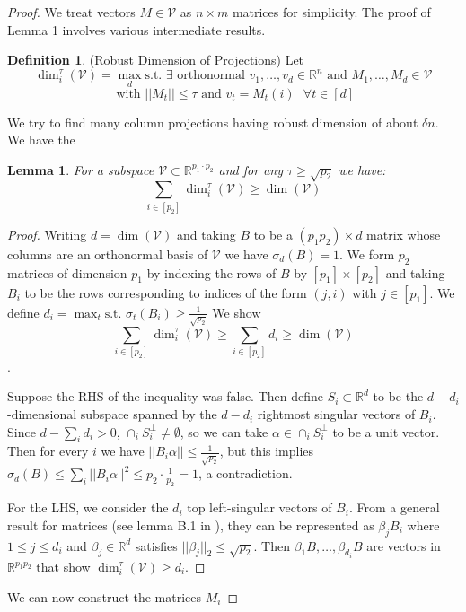 \documentclass[11pt]{article}
\newtheorem{lemma}{Lemma}
\theoremstyle{definition}
\newtheorem{definition}{Definition}
\begin{document}
\begin{proof}
We treat vectors $M\in \mathcal{V}$ as $n\times m$ matrices for simplicity. The proof of Lemma 1 involves various intermediate results.


\begin{definition} (Robust Dimension of Projections) Let
$$\dim_i^\tau (\mathcal{V}) = \max_{d}\text{s.t. }\exists\text{ orthonormal }v_1,\dots,v_d\in \mathbb{R}^n \text{ and }M_1,\dots,M_d\in\mathcal{V} $$
$$\text{ with } ||M_t||\leq \tau \text{ and } v_t=M_t(i)\text{ }\forall t\in[d]$$
\end{definition}
\noindent We try to find many column projections having robust dimension of about $\delta n$. We have the

\begin{lemma}
For a subspace $\mathcal{V}\subset \mathbb{R}^{p_1\cdot p_2}$ and for any $\tau\geq \sqrt{p_2}$ we have:
$$\sum_{i\in[p_2]}\dim_i^\tau (\mathcal{V})\geq \dim(\mathcal{V})$$
\end{lemma}

\begin{proof}
Writing $d=\dim(\mathcal{V})$ and taking $B$ to be a $(p_1p_2)\times d$ matrix whose columns are an orthonormal basis of $\mathcal{V}$ we have $\sigma_d(B)=1$. We form $p_2$ matrices of dimension $p_1$ by indexing the rows of $B$ by $[p_1]\times[p_2]$ and taking $B_i$ to be the rows corresponding to indices of the form $(j,i)$ with $j\in[p_1]$. We define
$d_i=\max_t \text{s.t. } \sigma_t(B_i)\geq \frac{1}{\sqrt{p_2}}$
We show $$\sum_{i\in[p_2]}\dim_i^\tau (\mathcal{V})\geq \sum_{i\in[p_2]} d_i\geq \dim(\mathcal{V})$$.

Suppose the RHS of the inequality was false. Then define $S_i\subset \mathbb{R}^d$ to be the $d-d_i$-dimensional subspace spanned by the $d-d_i$ rightmost singular vectors of $B_i$. Since $d-\sum_i d_i>0$, $\cap_i S_i^\perp\neq \emptyset$, so we can take $\alpha\in \cap_i S_i^\perp$ to be a unit vector. Then for every $i$ we have $||B_i\alpha||\leq \frac{1}{\sqrt{p_2}}$, but this implies $\sigma_d(B)\leq \sum_i||B_i\alpha||^2\leq p_2\cdot\frac{1}{p_2}=1$, a contradiction.

For the LHS, we consider the $d_i$ top left-singular vectors of $B_i$. From a general result for matrices (see lemma B.1 in \cite{TD}), they can be represented as $\beta_j B_i$ where $1\leq j\leq d_i$ and $\beta_j\in \mathbb{R}^{d}$ satisfies $||\beta_j||_2\leq \sqrt{p_2}$. Then $\beta_1B,\dots,\beta_{d_i}B$ are vectors in $\mathbb{R}^{p_1p_2}$ that show $\dim_i^\tau(\mathcal{V})\geq d_i$.

\end{proof}

We can now construct the matrices $M_i$


\end{proof}
\end{document}
